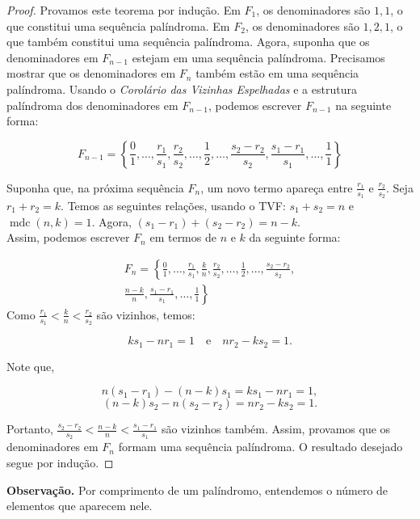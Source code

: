 \documentclass{hipatia}
\theoremstyle{definition} %
\begin{document}
\begin{proof}
Provamos este teorema por indução. Em \(F_{1}\), os denominadores são \(1, 1\), o que constitui uma sequência palíndroma. Em \(F_{2}\), os denominadores são \(1, 2, 1\), o que também constitui uma sequência palíndroma. Agora, suponha que os denominadores em \(F_{n-1}\) estejam em uma sequência palíndroma. Precisamos mostrar que os denominadores em \(F_{n}\) também estão em uma sequência palíndroma. Usando o \textit{Corolário das Vizinhas Espelhadas} e a estrutura palíndroma dos denominadores em \(F_{n-1}\), podemos escrever \(F_{n-1}\) na seguinte forma:

\[
F_{n-1} = \left\{ \frac{0}{1}, \ldots, \frac{r_{1}}{s_{1}}, \frac{r_{2}}{s_{2}}, \ldots, \frac{1}{2}, \ldots, \frac{s_{2} - r_{2}}{s_{2}}, \frac{s_{1} - r_{1}}{s_{1}}, \ldots, \frac{1}{1} \right\}
\]

Suponha que, na próxima sequência \(F_{n}\), um novo termo apareça entre \(\frac{r_{1}}{s_{1}}\) e \(\frac{r_{2}}{s_{2}}\). Seja \(r_{1} + r_{2} = k\). Temos as seguintes relações, usando o TVF: \(s_{1} + s_{2} = n\) e \(\operatorname{mdc}(n, k) = 1\).
Agora, \((s_{1} - r_{1}) + (s_{2} - r_{2}) = n - k\).\\
Assim, podemos escrever \(F_{n}\) em termos de \(n\) e \(k\) da seguinte forma:

\begin{multline*}
F_{n} = \left\{ \frac{0}{1}, \ldots, \frac{r_{1}}{s_{1}}, \frac{k}{n}, \frac{r_{2}}{s_{2}}, \ldots, \frac{1}{2}, \ldots, \frac{s_{2} - r_{2}}{s_{2}}, \right. \\
\left. \frac{n - k}{n}, \frac{s_{1} - r_{1}}{s_{1}}, \ldots, \frac{1}{1} \right\}
\end{multline*}
Como \(\frac{r_{1}}{s_{1}} < \frac{k}{n} < \frac{r_{2}}{s_{2}}\) são vizinhos, temos:

\[
k s_{1} - n r_{1} = 1 \quad \text{e} \quad n r_{2} - k s_{2} = 1.
\]

Note que,

\[
n(s_{1} - r_{1}) - (n - k)s_{1} = k s_{1} - n r_{1} = 1,
\]
\[
(n - k)s_{2} - n(s_{2} - r_{2}) = n r_{2} - k s_{2} = 1.
\]

Portanto, \(\frac{s_{2} - r_{2}}{s_{2}} < \frac{n - k}{n} < \frac{s_{1} - r_{1}}{s_{1}}\) são vizinhos também. Assim, provamos que os denominadores em \(F_{n}\) formam uma sequência palíndroma. O resultado desejado segue por indução.
\end{proof}

\noindent\textbf{Observação.} Por comprimento de um palíndromo, entendemos o número de elementos que aparecem nele.
\end{document}

